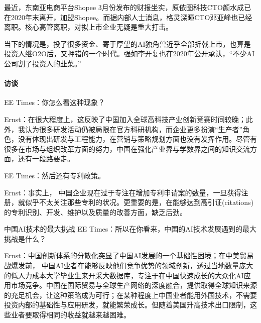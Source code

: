 \documentclass[letterpaper,11pt,english]{sphinxmanual}
\begin{document}
最近，东南亚电商平台Shopee
3月份发布的财报坐实，原依图科技CTO颜水成已在2020年末离开，加盟Shopee。而据内部人士消息，格灵深瞳CTO邓亚峰也已经离职。核心高管离职，对拟上市企业无疑是重大打击。

当下的情况是，投了很多资金、寄于厚望的AI独角兽近乎全部折戟上市，也算是投资人继O2O后，又押错的一个时代。强如李开复也在2020年公开承认，“不少AI公司割了投资人的韭菜。”


\paragraph{访谈}
\label{\detokenize{chapter_project/AI_industry_analysis:id27}}
EE
Times：你怎么看这种现象？%
\begin{footnote}[648]\sphinxAtStartFootnote
{}
%
\end{footnote}

Ernst：在很大程度上，这反映了中国加入全球高科技产业创新竞赛时间较晚；此外，我认为很多研发活动仍被局限在官方科研机构，而企业更多扮演“生产者”角色，没有体现出研发与工程能力，在营销与策略规划方面也没有发挥作用。尽管有很多在市场与组织改革方面的努力，中国在强化产业界与学数界之间的知识交流方面，还有一段路要走。

EE Times：然后还有专利政策。

Ernst：事实上，
中国企业现在过于专注在增加专利申请案的数量，一旦获得注册，就似乎不太关注那些专利的状况。更重要的是，在能够达到高引证(citations)的专利识别、开发、维护以及质量的改善方面，缺乏后劲。

中国AI技术的最大挑战 EE
Times：所以在你看来，中国的AI技术发展遇到的最大挑战是什么？

Ernst：中国创新体系的分散化突显了中国AI发展的一个基础性困境；在中美贸易战爆发前，
中国AI业者在能够反映他们竞争优势的领域创新，透过当地数量庞大的低人力成本大学毕业生来开采大数据库，专注于在中国快速成长的大众化AI应用市场竞争。中国在国际贸易与全球生产网络的深度融合，提供取得全球知识来源的充足机会，让这种策略成为可行；在某种程度上中国业者能用外国技术，不需要投资内部的基础性与应用研发，就能繁荣成长。但随着美国升高技术出口限制，这些业者要取得相同的收益就越来越困难。
\end{document}
